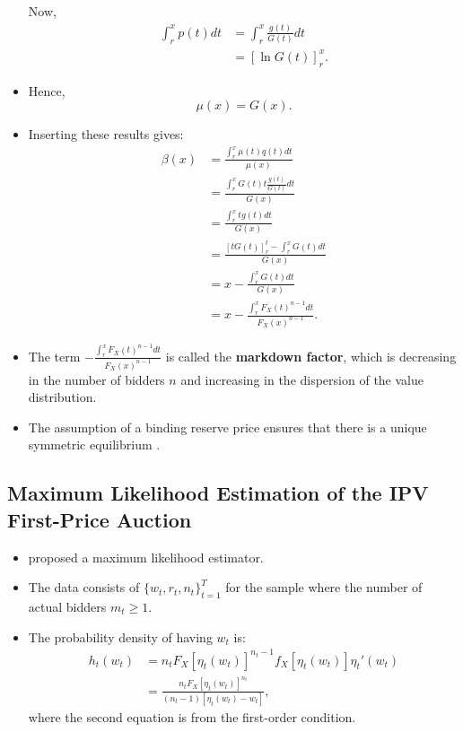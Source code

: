 \documentclass[
]{book}
\providecommand{\tightlist}{%
  \setlength{\itemsep}{0pt}\setlength{\parskip}{0pt}}
\begin{document}
\begin{itemize}
  Now,
  \[
  \begin{split}
  \int_{r}^x p(t) dt &= \int_{r}^x \frac{g(t)}{G(t)} dt\\
  &= [\ln G(t)]_r^x.
  \end{split}
  \]
\item
  Hence,
  \[
  \mu(x) = G(x).
  \]
\item
  Inserting these results gives:
  \[
  \begin{split}
  \beta(x) &= \frac{\int_r^x \mu(t) q(t) dt}{\mu(x)}\\
  &= \frac{\int_r^x G(t) t \frac{g(t)}{G(t)} dt}{G(x)}\\
  &= \frac{\int_r^x t g(t) dt}{G(x)}\\
  &= \frac{[t G(t)]_r^t - \int_{r}^x G(t) dt }{G(x)}\\
  &= x - \frac{\int_r^x G(t) dt}{G(x)}\\
  &= x - \frac{\int_r^x F_X(t)^{n - 1} dt}{F_X(x)^{n - 1}}.
  \end{split}
  \]
\item
  The term \(- \frac{\int_r^x F_X(t)^{n - 1} dt}{F_X(x)^{n - 1}}\) is called the \textbf{markdown factor}, which is decreasing in the number of bidders \(n\) and increasing in the dispersion of the value distribution.
\item
  The assumption of a binding reserve price ensures that there is a unique symmetric equilibrium \citep{atheyChapter60Nonparametric2007}.
\end{itemize}

\hypertarget{maximum-likelihood-estimation-of-the-ipv-first-price-auction}{%
\subsection{Maximum Likelihood Estimation of the IPV First-Price Auction}\label{maximum-likelihood-estimation-of-the-ipv-first-price-auction}}

\begin{itemize}
\tightlist
\item
  \citet{donaldPiecewisePseudoMaximumLikelihood1993} proposed a maximum likelihood estimator.
\item
  The data consists of \(\{w_t, r_t, n_t\}_{t = 1}^T\) for the sample where the number of actual bidders \(m_t \ge 1\).
\item
  The probability density of having \(w_t\) is:
  \[
  \begin{split}
  h_t(w_t) &= n_t F_X[\eta_t(w_t)]^{n_t - 1} f_X[\eta_t(w_t)] \eta_t'(w_t)\\
  &= \frac{n_t F_X[\eta_t(w_t)]^{n_t}}{(n_t - 1)[\eta_t(w_t) - w_t]},
  \end{split}
  \]
  where the second equation is from the first-order condition.
\end{itemize}
\end{document}
